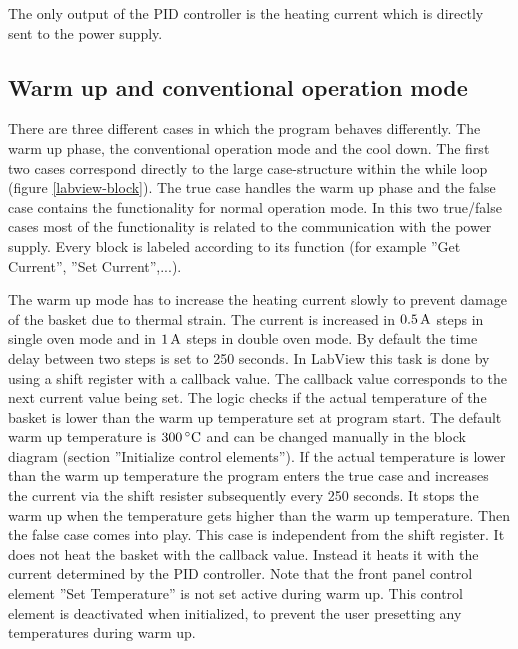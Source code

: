 \documentclass[parskip,12pt,headsepline,a4paper] {scrbook}
\begin{document}
The only output of the PID controller is the heating current which is directly sent to the power supply. %

\subsection{Warm up and conventional operation mode}
\vspace{-1\baselineskip}
There are three different cases in which the program behaves differently. The warm up phase, the conventional operation mode and the cool down. The first two cases correspond directly to the large case-structure within the while loop (figure \ref{labview-block}). The true case handles the warm up phase and the false case contains the functionality for normal operation mode. In this two true/false cases most of the functionality is related to the communication with the power supply. Every block is labeled according to its function (for example ''Get Current'', ''Set Current'',...).

The warm up mode has to increase the heating current slowly to prevent damage of the basket due to thermal strain. The current is increased in $\unit[0.5]{A}$ steps in single oven mode and in $\unit[1]{A}$ steps in double oven mode. By default the time delay between two steps is set to 250 seconds. In LabView this task is done by using a shift register with a callback value. The callback value corresponds to the next current value being set. The logic checks if the actual temperature of the basket is lower than the warm up temperature set at program start. The default warm up temperature is $\unit[300]{^\circ C}$ and can be changed manually in the block diagram (section ''Initialize control elements''). If the actual temperature is lower than the warm up temperature the program enters the true case and increases the current via the shift resister subsequently every 250 seconds. It stops the warm up when the temperature gets higher than the warm up temperature. Then the false case comes into play. This case is independent from the shift register. It does not heat the basket with the callback value. Instead it heats it with the current determined by the PID controller. Note that the front panel control element ''Set Temperature'' is not set active during warm up. This control element is deactivated when initialized, to prevent the user presetting any temperatures during warm up.
\end{document}
